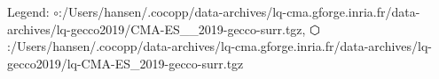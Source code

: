 Legend: {\color{NavyBlue}$\circ$}:/Users/hansen/.cocopp/data-archives/lq-cma.gforge.inria.fr/data-archives/lq-gecco2019/CMA-ES\_\_2019-gecco-surr.tgz, {\color{red}$\varhexagon$}:/Users/hansen/.cocopp/data-archives/lq-cma.gforge.inria.fr/data-archives/lq-gecco2019/lq-CMA-ES\_2019-gecco-surr.tgz